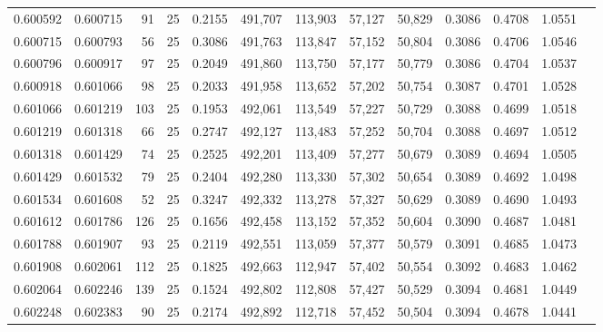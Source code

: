 \begin{tabular}{rrrrrrrrrrrrr}
0.600592 & 0.600715 &    91 &  25 &                                     0.2155 & 491,707 & 113,903 &  57,127 &  50,829 & 0.3086 & 0.4708 & 1.0551 \\
0.600715 & 0.600793 &    56 &  25 &                                     0.3086 & 491,763 & 113,847 &  57,152 &  50,804 & 0.3086 & 0.4706 & 1.0546 \\
0.600796 & 0.600917 &    97 &  25 &                                     0.2049 & 491,860 & 113,750 &  57,177 &  50,779 & 0.3086 & 0.4704 & 1.0537 \\
0.600918 & 0.601066 &    98 &  25 &                                     0.2033 & 491,958 & 113,652 &  57,202 &  50,754 & 0.3087 & 0.4701 & 1.0528 \\
0.601066 & 0.601219 &   103 &  25 &                                     0.1953 & 492,061 & 113,549 &  57,227 &  50,729 & 0.3088 & 0.4699 & 1.0518 \\
0.601219 & 0.601318 &    66 &  25 &                                     0.2747 & 492,127 & 113,483 &  57,252 &  50,704 & 0.3088 & 0.4697 & 1.0512 \\
0.601318 & 0.601429 &    74 &  25 &                                     0.2525 & 492,201 & 113,409 &  57,277 &  50,679 & 0.3089 & 0.4694 & 1.0505 \\
0.601429 & 0.601532 &    79 &  25 &                                     0.2404 & 492,280 & 113,330 &  57,302 &  50,654 & 0.3089 & 0.4692 & 1.0498 \\
0.601534 & 0.601608 &    52 &  25 &                                     0.3247 & 492,332 & 113,278 &  57,327 &  50,629 & 0.3089 & 0.4690 & 1.0493 \\
0.601612 & 0.601786 &   126 &  25 &                                     0.1656 & 492,458 & 113,152 &  57,352 &  50,604 & 0.3090 & 0.4687 & 1.0481 \\
0.601788 & 0.601907 &    93 &  25 &                                     0.2119 & 492,551 & 113,059 &  57,377 &  50,579 & 0.3091 & 0.4685 & 1.0473 \\
0.601908 & 0.602061 &   112 &  25 &                                     0.1825 & 492,663 & 112,947 &  57,402 &  50,554 & 0.3092 & 0.4683 & 1.0462 \\
0.602064 & 0.602246 &   139 &  25 &                                     0.1524 & 492,802 & 112,808 &  57,427 &  50,529 & 0.3094 & 0.4681 & 1.0449 \\
0.602248 & 0.602383 &    90 &  25 &                                     0.2174 & 492,892 & 112,718 &  57,452 &  50,504 & 0.3094 & 0.4678 & 1.0441 \\

\end{tabular}
